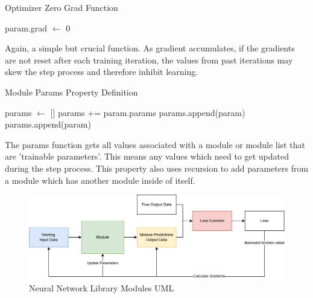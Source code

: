 \documentclass{article}
\begin{document}
    \begin{algorithm} 
        \caption{Optimizer Zero Grad Function}
        \begin{algorithmic}
                \State param.grad $\gets$ 0
            \EndFor
        \EndFunction
        \end{algorithmic}
    \end{algorithm}

    Again, a simple but crucial function. As gradient accumulates, if the gradients are not reset after each training iteration, the values from past iterations
    may skew the step process and therefore inhibit learning.

    \begin{algorithm} 
        \caption{Module Params Property Definition}
        \begin{algorithmic}
            \State params $\gets$ []
                    \State params += param.params
                    \State params.append(param)
                    \State params.append(param)
                \EndIf
            \EndFor
        \EndFunction
        \end{algorithmic}
    \end{algorithm}

    The params function gets all values associated with a module or module list that are 'trainable parameters'. This means
    any values which need to get updated during the step process. This property also uses recursion to add parameters from a module
    which has another module inside of itself.


    \begin{figure}
        \centering
        \includegraphics[scale=0.2]{ModuleTrainingFlow.drawio.png}
        \caption{Neural Network Library Modules UML}
    \end{figure}
\end{document}
